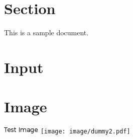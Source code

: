 \documentclass{article}
\begin{document}
\section{Section}
This is a sample document.

\section{Input}



\section{Image}
\includegraphics{image/dummy1.png}
\texttt{[image: image/dummy2.pdf]}
\end{document}
